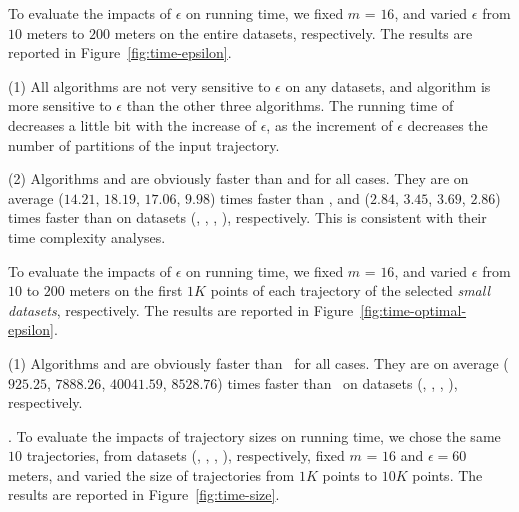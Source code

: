 {%
To evaluate the impacts of $\epsilon$ on running time, we fixed $m$ = $16$,
and varied $\epsilon$  from $10$ meters to $200$ meters on the entire
datasets, respectively.
The results are reported in Figure~\ref{fig:time-epsilon}.

\ni(1) All algorithms are not very sensitive to $\epsilon$ on any datasets, and algorithm \dps is more sensitive to $\epsilon$ than the other three algorithms.
The running time of \dps decreases a little bit with the increase of $\epsilon$, as the increment of $\epsilon$ decreases the number of partitions of the input trajectory.


\ni(2) Algorithms \cist and \cista are obviously faster than \dps and \squishe for all cases.
They are on average ($14.21$, $18.19$, $17.06$, $9.98$) times faster than \dps,
and ($2.84$, $3.45$, $3.69$, $2.86$) times faster than \squishe on
{datasets} (\sercar, \geolife, \mopsi, \pricar), respectively.
 This is consistent with their time complexity analyses.

To evaluate the impacts of $\epsilon$ on running time, we fixed $m$ = $16$,
and varied $\epsilon$ from $10$ to $200$ meters on the first $1K$ points of each trajectory of the selected \textit{small datasets}, respectively.
The results are reported in Figure~\ref{fig:time-optimal-epsilon}.

\ni(1) Algorithms \cist and \cista are obviously faster than \osed~for all cases.
They are on average ($925.25$, $7888.26$, $40041.59$, $8528.76$) times faster than \osed~on
datasets (\sercar, \geolife, \mopsi, \pricar), respectively.

.
To evaluate the impacts of trajectory sizes on running time,
we chose the same {$10$} trajectories, from datasets (\sercar, \geolife, \mopsi, \pricar), respectively,
fixed $m$ = $16$ and $\epsilon = 60$ meters, and varied the size  of trajectories from $1K$ points to $10K$ points.
%
The results are reported in Figure~\ref{fig:time-size}.

}
